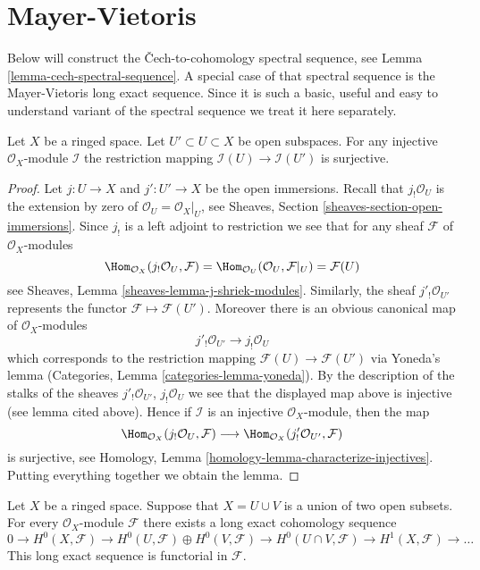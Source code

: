 \section{Mayer-Vietoris}
\label{section-mayer-vietoris}

\noindent
Below will construct the {\v C}ech-to-cohomology spectral sequence, see
Lemma \ref{lemma-cech-spectral-sequence}.
A special case of that spectral sequence is the Mayer-Vietoris
long exact sequence. Since it is such a basic, useful and easy to understand
variant of the spectral sequence we treat it here separately.

\begin{lemma}
\label{lemma-injective-restriction-surjective}
Let $X$ be a ringed space.
Let $U' \subset U \subset X$ be open subspaces.
For any injective $\mathcal{O}_X$-module $\mathcal{I}$ the
restriction mapping
$\mathcal{I}(U) \to \mathcal{I}(U')$ is surjective.
\end{lemma}

\begin{proof}
Let $j : U \to X$ and $j' : U' \to X$ be the open immersions.
Recall that $j_!\mathcal{O}_U$ is the extension by zero of
$\mathcal{O}_U = \mathcal{O}_X|_U$, see
Sheaves, Section \ref{sheaves-section-open-immersions}.
Since $j_!$ is a left adjoint to restriction we see that
for any sheaf $\mathcal{F}$ of $\mathcal{O}_X$-modules
$$
\Hom_{\mathcal{O}_X}(j_!\mathcal{O}_U, \mathcal{F})
=
\Hom_{\mathcal{O}_U}(\mathcal{O}_U, \mathcal{F}|_U)
=
\mathcal{F}(U)
$$
see Sheaves, Lemma \ref{sheaves-lemma-j-shriek-modules}.
Similarly, the sheaf $j'_!\mathcal{O}_{U'}$ represents the
functor $\mathcal{F} \mapsto \mathcal{F}(U')$.
Moreover there
is an obvious canonical map of $\mathcal{O}_X$-modules
$$
j'_!\mathcal{O}_{U'} \longrightarrow j_!\mathcal{O}_U
$$
which corresponds to the restriction mapping
$\mathcal{F}(U) \to \mathcal{F}(U')$ via Yoneda's lemma
(Categories, Lemma \ref{categories-lemma-yoneda}). By the description
of the stalks of the sheaves
$j'_!\mathcal{O}_{U'}$, $j_!\mathcal{O}_U$
we see that the displayed map above is injective (see lemma cited above).
Hence if $\mathcal{I}$ is an injective $\mathcal{O}_X$-module,
then the map
$$
\Hom_{\mathcal{O}_X}(j_!\mathcal{O}_U, \mathcal{F})
\longrightarrow
\Hom_{\mathcal{O}_X}(j'_!\mathcal{O}_{U'}, \mathcal{F})
$$
is surjective, see
Homology, Lemma \ref{homology-lemma-characterize-injectives}.
Putting everything together we obtain the lemma.
\end{proof}

\begin{lemma}
\label{lemma-mayer-vietoris}
Let $X$ be a ringed space. Suppose that $X = U \cup V$ is a
union of two open subsets. For every $\mathcal{O}_X$-module $\mathcal{F}$
there exists a long exact cohomology sequence
$$
0 \to
H^0(X, \mathcal{F}) \to
H^0(U, \mathcal{F}) \oplus H^0(V, \mathcal{F}) \to
H^0(U \cap V, \mathcal{F}) \to
H^1(X, \mathcal{F}) \to \ldots
$$
This long exact sequence is functorial in $\mathcal{F}$.
\end{lemma}

